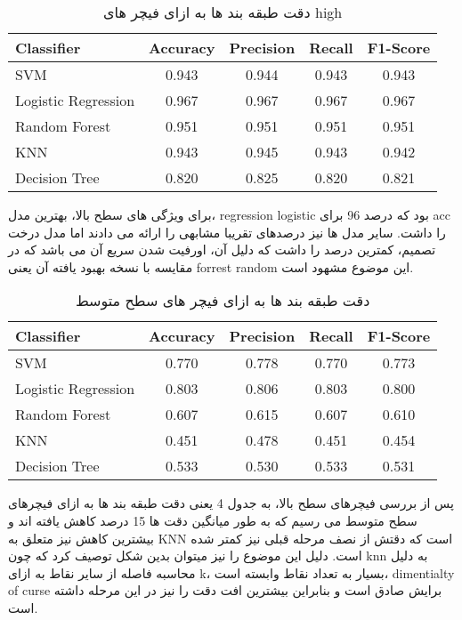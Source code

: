 \documentclass[a4paper,12pt]{article}
\begin{document}
\begin{table}[h]
	\centering
	\begin{latin}
	\begin{tabular}{|l|c|c|c|c|}
		\hline
		 \textbf{Classifier} & \textbf{Accuracy} & \textbf{Precision} & \textbf{Recall} & \textbf{F1-Score} \\
		\hline
		 SVM & 0.943 & 0.944 & 0.943 & 0.943 \\
		\hline
		 Logistic Regression & 0.967 & 0.967 & 0.967 & 0.967 \\
		\hline
		 Random Forest & 0.951 & 0.951 & 0.951 & 0.951 \\
		\hline
		 KNN & 0.943 & 0.945 & 0.943 & 0.942 \\
		\hline
		 Decision Tree & 0.820 & 0.825 & 0.820 & 0.821 \\
		\hline
	\end{tabular}
	\end{latin}
	\caption{دقت طبقه بند ها به ازای فیچر های high}
	\label{tab:classifier_performance}
\end{table}
برای ویژگی های سطح بالا، بهترین مدل، regression logistic بود که درصد 96 برای acc را داشت. سایر مدل ها نیز درصدهای تقریبا مشابهی را ارائه می دادند اما مدل درخت تصمیم، کمترین درصد را داشت که دلیل آن، اورفیت شدن سریع آن می باشد که در مقایسه با نسخه بهبود یافته آن یعنی forrest random این موضوع مشهود است. 

\begin{table}[h]
	\centering
	\begin{latin}
	\begin{tabular}{|l|c|c|c|c|}
		\hline
		\textbf{Classifier} & \textbf{Accuracy} & \textbf{Precision} & \textbf{Recall} & \textbf{F1-Score} \\
		\hline
		SVM & 0.770 & 0.778 & 0.770 & 0.773 \\
		\hline
		Logistic Regression & 0.803 & 0.806 & 0.803 & 0.800 \\
		\hline
		Random Forest & 0.607 & 0.615 & 0.607 & 0.610 \\
		\hline
		KNN & 0.451 & 0.478 & 0.451 & 0.454 \\
		\hline
		Decision Tree & 0.533 & 0.530 & 0.533 & 0.531 \\
		\hline
	\end{tabular}
	\end{latin}
	\caption{دقت طبقه بند ها به ازای فیچر های سطح متوسط}
	\label{tab:classifier_performance_2}
\end{table}
پس از بررسی فیچرهای سطح بالا، به جدول 4 یعنی دقت طبقه بند ها به ازای فیچرهای سطح متوسط می رسیم که به طور میانگین دقت ها 15 درصد کاهش یافته اند و بیشترین کاهش نیز متعلق به KNN است که دقتش از نصف مرحله قبلی نیز کمتر شده است. دلیل این موضوع را نیز میتوان بدین شکل توصیف کرد که چون knn به دلیل محاسبه فاصله از سایر نقاط به ازای k، بسیار به تعداد نقاط وابسته است، dimentialty of curse برایش صادق است و بنابراین بیشترین افت دقت را نیز در این مرحله داشته است.
\end{document}

